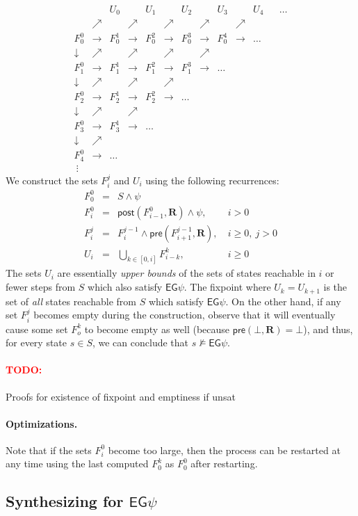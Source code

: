 \documentclass[10pt]{article}
\newcommand{\ctrans}{\ensuremath{\mathbf{R}}\xspace}
\newcommand{\eg}[1]{\ensuremath{\mathsf{EG}#1\xspace}}
\newcommand{\post}[2]{\ensuremath{\mathsf{post}(#1, #2)}\xspace}
\newcommand{\pre}[2]{\ensuremath{\mathsf{pre}(#1, #2)}\xspace}
\newcommand{\todo}[1]{\paragraph{\textcolor{Red}{\textbf{TODO:}}} #1}
\begin{document}
\begin{spacing}{1}
\begin{eqnarray*}[lclclclclclcl]
& & U_0 & & U_1 & & U_2 & & U_3 & & U_4 & & \ldots\\
& \nearrow & & \nearrow & & \nearrow & & \nearrow & & \nearrow &\\
F_0^0 & \rightarrow & F_0^1 & \rightarrow & F_0^2 & \rightarrow & F_0^3 &
\rightarrow & F_0^4 & \rightarrow & \ldots\\
\downarrow & \nearrow & & \nearrow & & \nearrow & & \nearrow\\
F_1^0 & \rightarrow & F_1^1 & \rightarrow & F_1^2 & \rightarrow &
F_1^3 & \rightarrow & \ldots\\
\downarrow & \nearrow & & \nearrow & & \nearrow \\
F_2^0 & \rightarrow & F_2^1 & \rightarrow & F_2^2 & \rightarrow &
\ldots\\
\downarrow & \nearrow & & \nearrow\\
F_3^0 & \rightarrow & F_3^1 & \rightarrow & \ldots\\
\downarrow & \nearrow\\
F_4^0 & \rightarrow & \ldots\\
\ \vdots
\end{eqnarray*}
We construct the sets $F_i^j$ and $U_i$ using the following
recurrences:
\begin{eqnarray*}[lcll]
F_0^0 & = & S \wedge \psi &\\
F_i^0 & = & \post{F_{i-1}^0}{\ctrans} \wedge \psi, & \ i > 0\\
F_i^j & = & F_i^{j-1} \wedge \pre{F_{i+1}^{j-1}}{\ctrans}, & \ i \geq 0,\ j >
0\\
U_i & = & \bigcup_{k \in [0,i]} F_{i-k}^{k}, &\ i \geq 0
\end{eqnarray*}
The sets $U_i$ are essentially \emph{upper bounds} of the sets of
states reachable in $i$ or fewer steps from $S$ which also satisfy
$\eg{\psi}$. The fixpoint where $U_k = U_{k+1}$ is the set of
\emph{all} states reachable from $S$ which satisfy \eg{\psi}. On the
other hand, if any set $F_i^j$ becomes empty during the construction,
observe that it will eventually cause some set $F_o^k$ to become empty
as well (because $\pre{\bot}{\ctrans} = \bot$), and thus, for every
state $s \in S$, we can conclude that $s \not\models \eg{\psi}$.

\todo{Proofs for existence of fixpoint and emptiness if unsat}

\paragraph{Optimizations.} Note that if the sets $F_i^0$ become too
large, then the process can be restarted at any time using the last
computed $F_0^k$ as $F_0^0$ after restarting.

\subsection{Synthesizing for $\eg{\psi}$}


\end{spacing}
\end{document}

